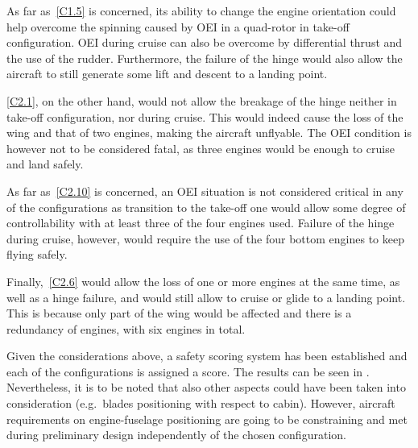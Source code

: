 As far as~\ref{C1.5} is concerned, its ability to change the engine orientation could help overcome the spinning caused by OEI in a quad-rotor in take-off configuration.
OEI during cruise can also be overcome by differential thrust and the use of the rudder.
Furthermore, the failure of the hinge would also allow the aircraft to still generate some lift and descent to
a landing point. 

\ref{C2.1}, on the other hand, would not allow the breakage of the hinge neither in take-off configuration, nor during cruise.
This would indeed cause the loss of the wing and that of two engines, making the aircraft unflyable.
The OEI condition is however not to be considered fatal, as three engines would be enough to cruise and land safely.

As far as~\ref{C2.10} is concerned, an OEI situation is not considered critical in any of the configurations as transition to the take-off one would allow some degree of controllability with at least three of the four engines used.
Failure of the hinge during cruise, however, would require the use of the four bottom engines to keep flying safely.

Finally,~\ref{C2.6} would allow the loss of one or more engines at the same time, as well as a hinge failure, and would still allow to cruise or glide to a landing point.
This is because only part of the wing would be affected and there is a redundancy of engines, with six engines in total.

Given the considerations above, a safety scoring system has been established and each of the configurations is assigned a score.
The results can be seen in . 
Nevertheless, it is to be noted that also other aspects could have been taken into consideration (e.g.\ blades positioning with respect to cabin).
However, aircraft requirements on engine-fuselage positioning are going to be constraining and met during preliminary design independently of the chosen configuration.

